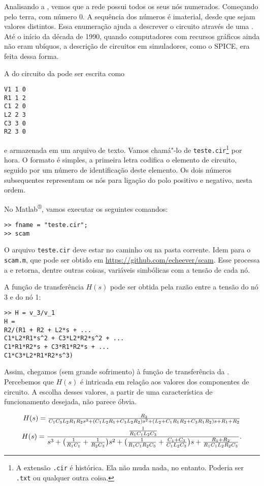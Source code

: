 Analisando a , vemos que a rede possui todos os seus nós numerados. Começando pelo terra, com número 0. A sequência dos números é imaterial, desde que sejam valores distintos. Essa enumeração ajuda a descrever o circuito através de uma . Até o início da década de 1990, quando computadores com recursos gráficos ainda não eram ubíquos, a descrição de circuitos em simuladores, como o SPICE, era feita dessa forma.

A  do circuito da  pode ser escrita como
\begin{lstlisting}
V1 1 0
R1 1 2
C1 2 0
L2 2 3
C3 3 0
R2 3 0
\end{lstlisting}
e armazenada em um arquivo de texto. Vamos chamá"-lo de \lstinline{teste.cir}\footnote{A extensão \lstinline{.cir} é histórica. Ela não muda nada, no entanto. Poderia ser \lstinline{.txt} ou qualquer outra coisa.} por hora. O formato é simples, a primeira letra codifica o elemento de circuito, seguido por um número de identificação deste elemento. Os dois números subsequentes representam os nós para ligação do polo positivo e negativo, nesta ordem.

No Matlab\textsuperscript{®}, vamos executar os seguintes comandos:
\begin{lstlisting}
>> fname = "teste.cir";
>> scam
\end{lstlisting}

O arquivo \lstinline{teste.cir} deve estar no caminho ou na pasta corrente. Idem para o  \lstinline{scam.m}, que pode ser obtido em \url{https://github.com/echeever/scam}. Esse  processa a  e retorna, dentre outras coisas, variáveis simbólicas com a tensão de cada nó.

A função de transferência $H(s)$ pode ser obtida pela razão entre a tensão do nó 3 e do nó 1:
\begin{lstlisting}
>> H = v_3/v_1
H =
R2/(R1 + R2 + L2*s + ...
C1*L2*R1*s^2 + C3*L2*R2*s^2 + ...
C1*R1*R2*s + C3*R1*R2*s + ...
C1*C3*L2*R1*R2*s^3)
\end{lstlisting}

Assim, chegamos (sem grande sofrimento) à função de transferência da . Percebemos que $H(s)$ é intricada em relação aos valores dos componentes de circuito. A escolha desses valores, a partir de uma característica de funcionamento desejada, não parece óbvia.

\begin{gather}\label{eq:pi}
	{\textstyle H(s)=\frac{R_2}{C_1C_3L_2R_1R_2s^3+(C_1L_2R_1+C_3L_2R_2)s^2+(L_2+C_1R_1R_2+C_3R_1R_2)s+R_1+R_2}}\notag\\
	H(s)=\frac{\frac{1}{R_1C_1L_2C_3}}{s^3+\big(\frac{1}{R_1C_1}+\frac{1}{R_2C_3}\big)s^2+\big(\frac{1}{R_1C_1R_2C_3}+\frac{C_1+C_3}{C_1L_2C_3}\big)s+\frac{R_1+R_2}{R_1C_1L_2R_2C_3}}.\raisetag{-1em}
\end{gather}

